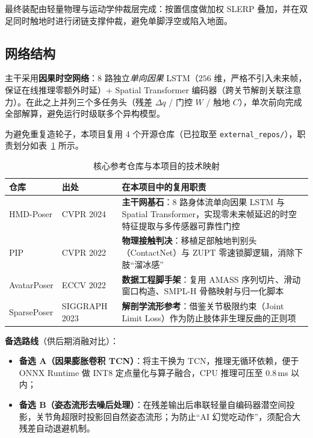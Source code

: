 \documentclass[scheme=plain,UTF8,11pt,a4paper]{ctexart}
\begin{document}
最终装配由轻量物理与运动学仲裁层完成：按置信度做加权 SLERP 叠加，并在双足同时触地时进行闭链支撑仲裁，避免单脚浮空或陷入地面。

\subsection{网络结构}

主干采用\textbf{因果时空网络}：8 路独立\emph{单向因果} LSTM（$256$ 维，严格不引入未来帧，保证在线推理零额外时延）+ Spatial Transformer 编码器（跨关节解剖关联注意力）。在此之上并列三个多任务头（残差 $\Delta q$ / 门控 $W$ / 触地 $C$），单次前向完成全部解算，避免运行时级联多个异构模型。

为避免重复造轮子，本项目复用 4 个开源仓库（已拉取至 \texttt{external\_repos/}），职责划分如表~\ref{tab:repos} 所示。

\begin{table}[H]
\centering
\small
\caption{核心参考仓库与本项目的技术映射}
\label{tab:repos}
\begin{tabular}{p{2.6cm}p{2.4cm}p{8.4cm}}
\toprule
\textbf{仓库} & \textbf{出处} & \textbf{在本项目中的复用职责} \\
\midrule
HMD-Poser     & CVPR 2024   & \textbf{主干网基石}：8 路身体流单向因果 LSTM 与 Spatial Transformer，实现零未来帧延迟的时空特征提取与多传感器可靠性门控 \\
PIP           & CVPR 2022   & \textbf{物理接触判决}：移植足部触地判别头（ContactNet）与 ZUPT 零速锁脚逻辑，消除下肢“溜冰感” \\
AvatarPoser   & ECCV 2022   & \textbf{数据工程脚手架}：复用 AMASS 序列切片、滑动窗口构造、SMPL-H 骨骼映射与归一化脚本 \\
SparsePoser   & SIGGRAPH 2023 & \textbf{解剖学流形参考}：借鉴关节极限约束（Joint Limit Loss）作为防止肢体非生理反曲的正则项 \\
\bottomrule
\end{tabular}
\end{table}

\textbf{备选路线}（供后期消融对比）：
\begin{itemize}
    \item \textbf{备选 A（因果膨胀卷积 TCN）}：将主干换为 TCN，推理无循环依赖，便于 ONNX Runtime 做 INT8 定点量化与算子融合，CPU 推理可压至 $0.8$\,ms 以内；
    \item \textbf{备选 B（姿态流形去噪后处理）}：在残差输出后串联轻量自编码器潜空间投影，关节角超限时投影回自然姿态流形；为防止“AI 幻觉吃动作”，须配合大残差自动退避机制。
\end{itemize}
\end{document}
